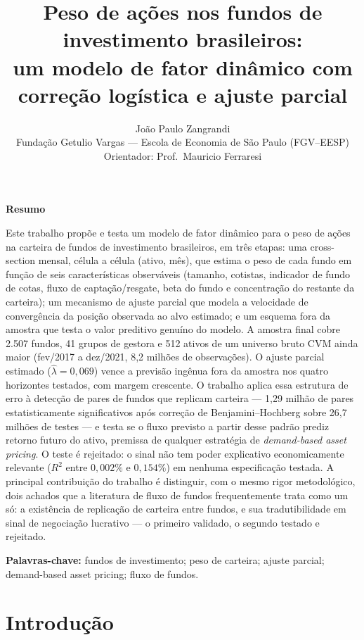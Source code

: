 \documentclass[11pt,a4paper]{article}
\title{Peso de ações nos fundos de investimento brasileiros:\\
um modelo de fator dinâmico com correção logística e ajuste parcial}
\author{João Paulo Zangrandi\\
Fundação Getulio Vargas --- Escola de Economia de São Paulo (FGV--EESP)\\
Orientador: Prof.\ Mauricio Ferraresi}
\date{}
\begin{document}
\maketitle

\begin{center}
\textbf{\large Resumo}
\end{center}
\noindent
Este trabalho propõe e testa um modelo de fator dinâmico para o peso de ações na carteira de
fundos de investimento brasileiros, em três etapas: uma cross-section mensal, célula a célula
(ativo, mês), que estima o peso de cada fundo em função de seis características observáveis
(tamanho, cotistas, indicador de fundo de cotas, fluxo de captação/resgate, beta do fundo e
concentração do restante da carteira); um mecanismo de ajuste parcial que modela a velocidade de
convergência da posição observada ao alvo estimado; e um esquema fora da amostra que testa o
valor preditivo genuíno do modelo. A amostra final cobre 2.507 fundos, 41 grupos de gestora e 512
ativos de um universo bruto CVM ainda maior (fev/2017 a dez/2021, 8,2 milhões de observações). O
ajuste parcial estimado ($\widehat\lambda=0{,}069$) vence a previsão ingênua fora da amostra nos
quatro horizontes testados, com margem crescente. O trabalho aplica essa estrutura de erro à
detecção de pares de fundos que replicam carteira --- 1,29 milhão de pares estatisticamente
significativos após correção de Benjamini--Hochberg sobre 26,7 milhões de testes --- e testa se o
fluxo previsto a partir desse padrão prediz retorno futuro do ativo, premissa de qualquer
estratégia de \emph{demand-based asset pricing}. O teste é rejeitado: o sinal não tem poder
explicativo economicamente relevante ($R^2$ entre $0{,}002\%$ e $0{,}154\%$)
em nenhuma especificação testada. A principal contribuição do trabalho é distinguir, com o mesmo
rigor metodológico, dois achados que a literatura de fluxo de fundos frequentemente trata como um
só: a existência de replicação de carteira entre fundos, e sua tradutibilidade em sinal de
negociação lucrativo --- o primeiro validado, o segundo testado e rejeitado.

\bigskip
\noindent
\textbf{Palavras-chave:} fundos de investimento; peso de carteira; ajuste parcial; demand-based
asset pricing; fluxo de fundos.

\newpage

\tableofcontents
\newpage

\section{Introdução}
\label{sec:introducao}
\end{document}
